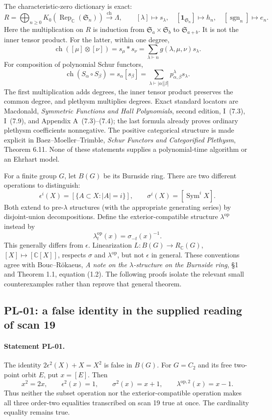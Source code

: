 The characteristic-zero dictionary is exact:
\[
 R=\bigoplus_{n\geq0}K_0(\operatorname{Rep}_{\mathbb C}(\mathfrak S_n))
 \xrightarrow{\operatorname{ch}}\Lambda,
 \qquad [\lambda]\longmapsto s_\lambda,
 \quad [\mathbf1_{\mathfrak S_n}]\longmapsto h_n,
 \quad [\operatorname{sgn}_n]\longmapsto e_n.
\]
Here the multiplication on $R$ is induction from
$\mathfrak S_a\times\mathfrak S_b$ to $\mathfrak S_{a+b}$. It is not the
inner tensor product. For the latter, within one degree,
\[
 \operatorname{ch}([\mu]\otimes[\nu])=s_\mu*s_\nu
   =\sum_{\lambda\vdash n}g(\lambda,\mu,\nu)s_\lambda.
\]
For composition of polynomial Schur functors,
\[
 \operatorname{ch}(S_\alpha\circ S_\beta)=s_\alpha[s_\beta]
   =\sum_{\lambda\vdash |\alpha||\beta|}p^\lambda_{\alpha,\beta}s_\lambda.
\]
The first multiplication adds degrees, the inner tensor product preserves the
common degree, and plethysm multiplies degrees. Exact standard locators are
Macdonald, \emph{Symmetric Functions and Hall Polynomials}, second edition,
I~(7.3), I~(7.9), and Appendix A~(7.3)--(7.4); the last formula already proves
ordinary plethysm coefficients nonnegative. The positive categorical structure
is made explicit in Baez--Moeller--Trimble, \emph{Schur Functors and Categorified
Plethysm}, Theorem 6.11. None of these statements supplies a polynomial-time
algorithm or an Ehrhart model.

For a finite group $G$, let $B(G)$ be its Burnside ring. There are two different
operations to distinguish:
\[
 \epsilon^i(X)=[\{A\subset X:|A|=i\}],\qquad
 \sigma^i(X)=[\operatorname{Sym}^iX].
\]
Both extend to pre-$\lambda$ structures (with the appropriate generating series)
by disjoint-union decompositions. Define the exterior-compatible structure
$\lambda^{\mathrm{op}}$ instead by
\[
 \lambda^{\mathrm{op}}_t(x)=\sigma_{-t}(x)^{-1}.
\]
This generally differs from $\epsilon$. Linearization
$L:B(G)\to R_{\mathbb C}(G)$, $[X]\mapsto[\mathbb C[X]]$, respects
$\sigma$ and $\lambda^{\mathrm{op}}$, but not $\epsilon$ in general.
These conventions agree with Bouc--R\"okaeus,
\emph{A note on the $\lambda$-structure on the Burnside ring},
\S1 and Theorem 1.1, equation (1.2). The following proofs isolate the relevant
small counterexamples rather than reprove that general theorem.

\subsection{PL-01: a false identity in the supplied reading of scan 19}
\paragraph{Statement PL-01.}
The identity $2\epsilon^2(X)+X=X^2$ is false in $B(G)$.
For $G=C_2$ and its free two-point orbit $E$, put $x=[E]$. Then
\[
 x^2=2x,\qquad \epsilon^2(x)=1,\qquad
 \sigma^2(x)=x+1,\qquad \lambda^{\mathrm{op},2}(x)=x-1.
\]
Thus neither the subset operation nor the exterior-compatible operation makes
all three order-two equalities transcribed on scan 19 true at once. The
cardinality equality remains true.

